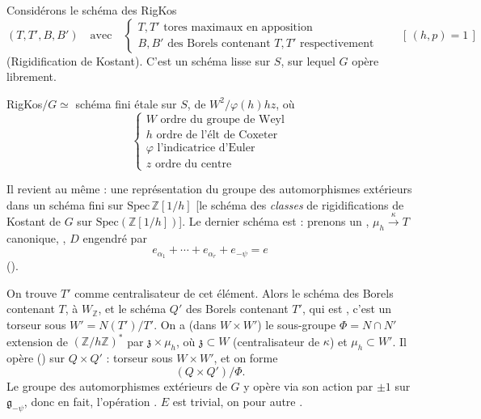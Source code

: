 \documentclass[11pt,a4paper]{article}
\begin{document}
Considérons le schéma des \struck{\ill{}} 
RigKos
\[
  (T, T', B, B') \quad \text{avec} \quad
  \begin{cases}
    T, T' \text{ tores maximaux en apposition} \\
    B, B' \text{ des Borels contenant } T, T' \text{ respectivement}
  \end{cases}
  \qquad [\,(h,p) = 1\,]
\]
(Rigidification de Kostant). C'est un schéma lisse sur $S$, sur lequel $G$
opère librement.

RigKos$/G \simeq$ schéma fini étale sur $S$,  de
 $W^{2}/\varphi(h)hz$, où
\[
  \begin{cases}
    W \text{ ordre du groupe de Weyl} \\
    h \text{ ordre de l'élt de Coxeter} \\
    \varphi \text{ l'indicatrice d'Euler} \\
    z \text{ ordre du centre}
  \end{cases}
\]

Il revient au même : une représentation du groupe \uncertain{$\Gamma$} des
automorphismes extérieurs dans un schéma fini  sur
$\mathrm{Spec}\,\mathbb{Z}[1/h]$ [le schéma des \emph{classes} de
rigidifications de Kostant de $G$ sur $\mathrm{Spec}(\mathbb{Z}[1/h])$]. Le
dernier schéma est \struck{\ill{}}  
 : prenons un , 
$\mu_h \xrightarrow{\kappa} T$ canonique, ,
$D$ engendré par
\[
  e_{\alpha_1} + \cdots + e_{\alpha_r} + e_{-\psi} = e
\]
().

On trouve $T'$ comme centralisateur \struck{\ill{}} de cet élément.
 \struck{\ill{}} Alors le schéma des Borels contenant $T$,
 à $W_{\mathbb{Z}}$, et le schéma $Q'$ des Borels
contenant $T'$, qui est  , \struck{\ill{}}
c'est un torseur sous $W' = N(T')/T'$. On a (dans $W \times W'$) le sous-groupe
$\Phi = N \cap N'$ extension de $(\mathbb{Z}/h\mathbb{Z})^{*}$ par
\struck{\ill{}} $\mathfrak{z} \times \mu_h$, où $\mathfrak{z} \subset W$
(centralisateur de $\kappa$) et $\mu_h \subset W'$. Il opère
() sur $Q \times Q'$ : torseur sous $W \times W'$, et on
forme
\[
  (Q \times Q')/\Phi .
\]
Le groupe des automorphismes extérieurs de $G$ y opère via son action par
$\pm 1$ sur $\mathfrak{g}_{-\psi}$, donc en fait, \struck{\ill{}}  l'opération  \ill{}.  $E$ est trivial, on
   pour  autre
.
\end{document}
